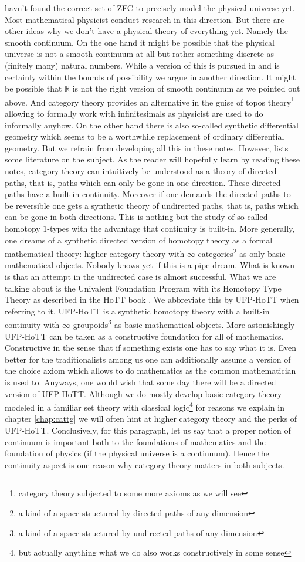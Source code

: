 havn't found the correct set of ZFC to precisely model the physical universe yet. Most mathematical physicist conduct research in this direction. But there are other ideas why we don't have a physical theory of everything yet. Namely the smooth continuum. On the one hand it might be possible that the physical universe is not a smooth continuum at all but rather something discrete as (finitely many) natural numbers. While a version of this is pursued in \cite{0b855cc5} and is certainly within the bounds of possibility we argue in another direction. It might be possible that $\mathbb{R}$ is not the right version of smooth continuum as we pointed out above. And category theory provides an alternative in the guise of topos theory\footnote{category theory subjected to some more axioms as we will see} allowing to formally work with infinitesimals as physicist are used to do informally anyhow. On the other hand there is also so-called synthetic differential geometry which seems to be a worthwhile replacement of ordinary differential geometry. But we refrain from developing all this in these notes. However, \cite{wiki-nlab0000} lists some literature on the subject. As the reader will hopefully learn by reading these notes, category theory can intuitively be understood as a theory of directed paths, that is, paths which can only be gone in one direction. These directed paths have a built-in continuity. Moreover if one demands the directed paths to be reversible one gets a synthetic theory of undirected paths, that is, paths which can be gone in both directions. This is nothing but the study of so-called homotopy $1$-types with the advantage that continuity is built-in. More generally, one dreams of a synthetic directed version of homotopy theory as a formal mathematical theory: higher category theory with $\infty$-categories\footnote{a kind of a space structured by directed paths of any dimension} as only basic mathematical objects. Nobody knows yet if this is a pipe dream. What is known is that an attempt in the undirected case is almost successful. What we are talking about is the Univalent Foundation Program with its Homotopy Type Theory as described in the HoTT book \cite{1ba1603e}. We abbreviate this by UFP-HoTT when referring to it. UFP-HoTT is a synthetic homotopy theory with a built-in continuity with $\infty$-groupoids\footnote{a kind of a space structured by undirected paths of any dimension} as basic mathematical objects. More astonishingly UFP-HoTT can be taken as a constructive foundation for all of mathematics. Constructive in the sense that if something exists one has to say what it is. Even better for the traditionalists among us one can additionally assume a version of the choice axiom which allows to do mathematics as the common mathematician is used to. Anyways, one would wish that some day there will be a directed version of UFP-HoTT. Although we do mostly develop basic category theory modeled in a familiar set theory with classical logic\footnote{but actually anything what we do also works constructively in some sense} for reasons we explain in chapter \ref{chap:cattg} we will often hint at higher category theory and the perks of UFP-HoTT. Conclusively, for this paragraph, let us say that a proper notion of continuum is important both to the foundations of mathematics and the foundation of physics (if the physical universe is a continuum). Hence the continuity aspect is one reason why category theory matters in both subjects.

